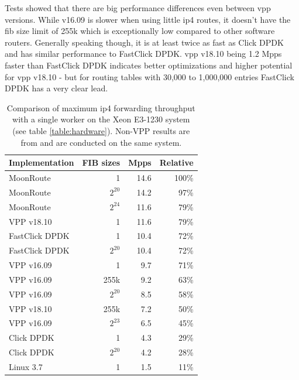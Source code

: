 Tests showed that there are big performance differences even between
\Ac{vpp} versions. While v16.09 is slower when using little \Ac{ip4}
routes, it doesn't have the \Ac{fib} size limit of 255k which is
exceptionally low compared to other software routers. Generally
speaking though, it is at least twice as fast as Click DPDK and has
similar performance to FastClick DPDK. \Ac{vpp} v18.10 being 1.2 Mpps
faster than FastClick DPDK indicates better optimizations and higher
potential for \Ac{vpp} v18.10 - but for routing tables with 30,000 to
1,000,000 entries FastClick DPDK has a very clear lead.


\begin{table}[!ht]
	\vspace{5ex}
	\begin{tabular}[]{ l r r r }
		Implementation	 & FIB sizes & Mpps		& Relative \\ 
		\midrule
		MoonRoute		 & 1		 & 14.6		& 100\% \\
		MoonRoute		 & $2^{20}$	 & 14.2		& 97\% \\
		MoonRoute		 & $2^{24}$	 & 11.6		& 79\% \\
		VPP v18.10		 & 1		 & 11.6		& 79\% \\
		FastClick DPDK	 & 1		 & 10.4 	& 72\% \\
		FastClick DPDK	 & $2^{20}$	 & 10.4 	& 72\% \\
		VPP v16.09		 & 1		 & 9.7	 	& 71\% \\
		VPP v16.09		 & 255k		 & 9.2	 	& 63\% \\
		VPP v16.09		 & $2^{20}$	 & 8.5	 	& 58\% \\
		VPP v18.10		 & 255k		 & 7.2	 	& 50\% \\
		VPP v16.09		 & $2^{23}$	 & 6.5	 	& 45\% \\
		Click DPDK		 & 1		 & 4.3 		& 29\% \\
		Click DPDK		 & $2^{20}$	 & 4.2 		& 28\% \\
		Linux 3.7		 & 1		 & 1.5 		& 11\% \\

		\midrule
	\end{tabular}
	\caption{Comparison of maximum \Ac{ip4} forwarding throughput with a single worker on the Xeon E3-1230 system (see table \ref{table:hardware}). Non-VPP results are from \cite{chair:architecture} and are conducted on the same system. }
	\label{table:comparison}
\end{table}



